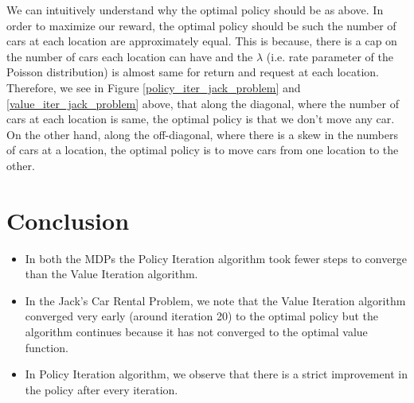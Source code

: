 \documentclass{article}
\begin{document}
\noindent %
We can intuitively understand why the optimal policy should be as above. In order to maximize our reward, the optimal policy should
be such the number of cars at each location are approximately equal. This is because, there is a cap on the number of cars
each location can have and the $\lambda$ (i.e. rate parameter of the Poisson distribution) is almost same for return and request at each
location. Therefore, we see in Figure \ref{policy_iter_jack_problem} and \ref{value_iter_jack_problem} above, that along the 
diagonal, where the number of cars at each location is same, the optimal policy is that we don't move any car. On the other hand, 
along the off-diagonal, where there is a skew in the numbers of cars at a location, the optimal policy is to move cars from one 
location to the other. 


\section{Conclusion}
\begin{itemize}
    \item In both the MDPs the Policy Iteration algorithm took fewer steps to converge than the Value Iteration algorithm.
    \item In the Jack's Car Rental Problem, we note that the Value Iteration algorithm converged very early (around iteration 20) 
    to the optimal policy but the algorithm continues because it has not converged to the optimal value function.
    \item In Policy Iteration algorithm, we observe that there is a strict improvement in the policy after every iteration.
\end{itemize}





\end{document}
